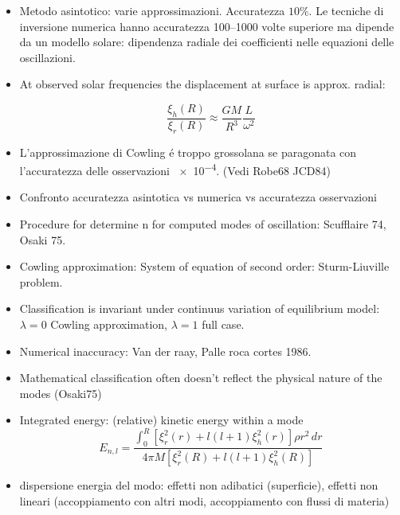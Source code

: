 \documentclass[../main.tex]{subfiles}
\begin{document}
{\begin{itemize}
    \item Metodo asintotico: varie approssimazioni. Accuratezza $10\%$. Le tecniche di inversione numerica hanno accuratezza \numrange{100}{1000} volte superiore ma dipende da un modello solare: dipendenza radiale dei coefficienti nelle equazioni delle oscillazioni.
    
    \item At observed solar frequencies the displacement at surface is approx. radial:
    
    \begin{equation*}
    \frac{\xi_h(R)}{\xi_r(R)}\approx\frac{GM}{R^3}\frac{L}{\omega^2}
    \end{equation*}
    
    \item L'approssimazione di Cowling \'e troppo grossolana se paragonata con l'accuratezza delle osservazioni \num{e-4}.
    (Vedi Robe68 JCD84)
    
    \item Confronto accuratezza asintotica vs numerica vs accuratezza osservazioni
    
    \item Procedure for determine n for computed modes of oscillation: Scufflaire 74, Osaki 75.
    
    \item Cowling approximation: System of equation of second order: Sturm-Liuville problem.
    \item Classification is invariant under continuus variation of equilibrium model: $\lambda=0$ Cowling approximation, $\lambda=1$ full case.
    
    \item Numerical inaccuracy: Van der raay, Palle roca cortes 1986.
    
    \item Mathematical classification often doesn't reflect the physical nature of the modes (Osaki75)
    
    \item Integrated energy: (relative) kinetic energy within a mode
    \begin{equation*}
    E_{n,l}=\frac{\int_0^R[\xi^2_r(r)+l(l+1)\xi_h^2(r)]\rho r^2\,dr}{4\pi M[\xi^2_r(R)+l(l+1)\xi_h^2(R)]}
    \end{equation*}
    
    \item dispersione energia del modo: effetti non adibatici (superficie), effetti non lineari (accoppiamento con altri modi, accoppiamento con flussi di materia)
    

\end{itemize}}
\end{document}
